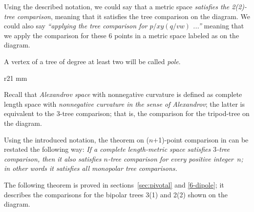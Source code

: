 Using the described notation, we could say that a metric space \emph{satisfies the 2(2)-tree comparison},  meaning that it satisfies the tree comparison on the diagram.
We could also say \emph{``applying the tree comparison for $p/xy(q/vw)$ ...''} meaning that we apply the comparison for these 6 points in a metric space labeled as on the diagram.

A vertex of a tree of degree at least two will be called \emph{pole}.

\begin{wrapfigure}{r}{21 mm}
\end{wrapfigure}

Recall that \emph{Alexandrov space} with nonnegative curvature is defined as complete length space with \emph{nonnegative curvature in the sense of Alexandrov};
the latter is equivalent to the 3-tree comparison; that is, the comparison for the tripod-tree on the diagram. 

Using the introduced notation, the theorem on ($n$+1)-point comparison in \cite{AKP} can be restated the following way: \emph{If a complete length-metric space satisfies $3$-tree comparison, then it also satisfies $n$-tree comparison for every positive integer~$n$; in other words it satisfies all monopolar tree comparisons.}

The following theorem is proved in sections~\ref{sec:pivotal} and \ref{6-dipole};
it describes the comparisons for the bipolar trees 3(1) and 2(2) shown on the diagram.

